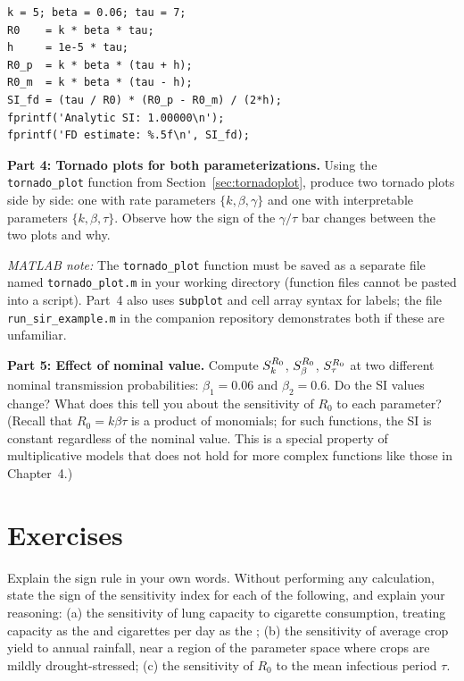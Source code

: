 \begin{verbatim}
k = 5; beta = 0.06; tau = 7;
R0    = k * beta * tau;
h     = 1e-5 * tau;
R0_p  = k * beta * (tau + h);
R0_m  = k * beta * (tau - h);
SI_fd = (tau / R0) * (R0_p - R0_m) / (2*h);
fprintf('Analytic SI: 1.00000\n');
fprintf('FD estimate: %.5f\n', SI_fd);
\end{verbatim}

\textbf{Part 4: Tornado plots for both parameterizations.}
Using the \texttt{tornado\_plot} function from Section~\ref{sec:tornadoplot},
produce two tornado plots side by side: one with rate parameters
$\{k, \beta, \gamma\}$ and one with interpretable parameters
$\{k, \beta, \tau\}$. Observe how the sign of the $\gamma/\tau$
bar changes between the two plots and why.

\medskip\noindent
\textit{MATLAB note:} The \texttt{tornado\_plot} function must be saved
as a separate file named \texttt{tornado\_plot.m} in your working directory
(function files cannot be pasted into a script).
Part~4 also uses \texttt{subplot} and cell array syntax for labels;
the file \texttt{run\_sir\_example.m} in the companion repository
demonstrates both if these are unfamiliar.

\textbf{Part 5: Effect of nominal value.}
Compute $S_{k}^{R_0}$, $S_{\beta}^{R_0}$, $S_{\tau}^{R_0}$ at
two different nominal transmission probabilities: $\beta_1 = 0.06$
and $\beta_2 = 0.6$. Do the SI values change? What does this
tell you about the sensitivity of $R_0$ to each parameter?
(Recall that $R_0 = k\beta\tau$ is a product of monomials;
for such functions, the SI is constant regardless of the nominal value.
This is a special property of multiplicative models that does not hold
for more complex functions like those in Chapter~4.)

\section{Exercises}
\label{sec:ch2exercises}

\begin{exercise}[\bloom{L2}]
\label{ex:ch2:signrule}
Explain the sign rule in your own words. Without performing any
calculation, state the sign of the sensitivity index for each of
the following, and explain your reasoning:
(a) the sensitivity of lung capacity to cigarette consumption,
    treating capacity as the \QOI and cigarettes per day as the \POI;
(b) the sensitivity of average crop yield to annual rainfall, near
    a region of the parameter space where crops are mildly drought-stressed;
(c) the sensitivity of $R_0$ to the mean infectious period $\tau$.
\end{exercise}

